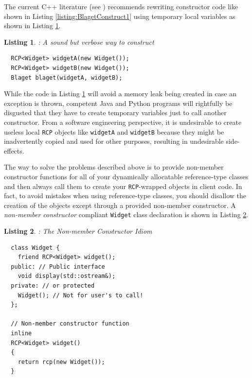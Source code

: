 \documentclass[pdf,ps2pdf,11pt]{SANDreport}
\newtheorem{listing}{Listing}
\begin{document}
The current C++ literature (see {}\cite[Item
13]{C++CodingStandards05}) recommends rewriting constructor code like
shown in Listing {}\ref{listing:BlagetConstruct1} using temporary local
variables as shown in Listing {}\ref{listing:BlagetConstruct2}.

\begin{listing}: A sound but verbose way to construct \\
\label{listing:BlagetConstruct2}
{\small\begin{verbatim}
  RCP<Widget> widgetA(new Widget());
  RCP<Widget> widgetB(new Widget());
  Blaget blaget(widgetA, widgetB);
\end{verbatim}}
\end{listing}

While the code in Listing {}\ref{listing:BlagetConstruct2} will avoid a
memory leak being created in case an exception is thrown, competent
Java and Python programs will rightfully be disgusted that they have
to create temporary variables just to call another constructor.  From
a software engineering perspective, it is undesirable to create
useless local {}\texttt{RCP} objects like {}\texttt{widgetA} and
{}\texttt{widgetB} because they might be inadvertently copied and used
for other purposes, resulting in undesirable side-effects.

The way to solve the problems described above is to provide non-member
constructor functions for all of your dynamically allocatable
reference-type classes and then always call them to create your
{}\texttt{RCP}-wrapped objects in client code.  In fact, to avoid
mistakes when using reference-type classes, you should disallow the
creation of the objects except through a provided non-member
constructor.  A {}\textit{non-member constructor} compliant
{}\texttt{Widget} class declaration is shown in Listing
{}\ref{listing:WidgetNonmemberConstructor}.

\begin{listing}: The Non-member Constructor Idiom\\
\label{listing:WidgetNonmemberConstructor}
{\small\begin{verbatim}
  class Widget {
    friend RCP<Widget> widget();
  public: // Public interface
    void display(std::ostream&);
  private: // or protected
    Widget(); // Not for user's to call!
  };

  // Non-member constructor function
  inline
  RCP<Widget> widget()
  {
    return rcp(new Widget());
  }
\end{verbatim}}
\end{listing}
\end{document}
